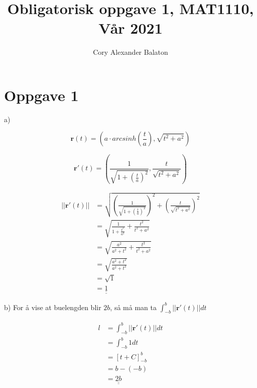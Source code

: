 \documentclass[12pt, a4paper]{article}
\title{Obligatorisk oppgave 1, MAT1110, Vår 2021}
\author{Cory Alexander Balaton}
\date{}
\begin{document}
\maketitle 
\newpage

\section*{Oppgave 1}

a) 

\begin{equation}
    \textbf{r}(t) = \left(a \cdot arcsinh\left(\frac{t}{a}\right), \sqrt{t^2 + a^2}\right)
\end{equation}

\begin{equation}
    \textbf{r}'(t) = \left(\frac{1}{\sqrt{1 + (\frac{t}{a})^2}}, \frac{t}{\sqrt{t^2 + a^2}}\right)
\end{equation}

\begin{equation}
    \begin{split}
        ||\textbf{r}'(t)|| &= \sqrt{\left(\frac{1}{\sqrt{1 + (\frac{t}{a})^2}}\right)^2 + \left(\frac{t}{\sqrt{t^2 + a^2}}\right)^2} \\
                           &= \sqrt{\frac{1}{1 + \frac{t^2}{a^2}} + \frac{t^2}{t^2 + a^2}} \\
                           &= \sqrt{\frac{a^2}{a^2 + t^2} + \frac{t^2}{t^2 + a^2}} \\
                           &= \sqrt{\frac{a^2 + t^2}{a^2 + t^2}} \\
                           &= \sqrt{1} \\
                           &= \underline{\underline{1}}
    \end{split}
\end{equation}

b) For å vise at buelengden blir $2b$, så må man ta $\int_{-b}^b ||\textbf{r}'(t)|| dt$

\begin{equation}
    \begin{split}
        l &= \int_{-b}^b ||\textbf{r}'(t)|| dt \\
          &= \int_{-b}^b 1 dt \\
          &= [t + C]_{-b}^b \\
          &= b - (-b) \\
          &= \underline{\underline{2b}}
    \end{split}
\end{equation}
\end{document}

